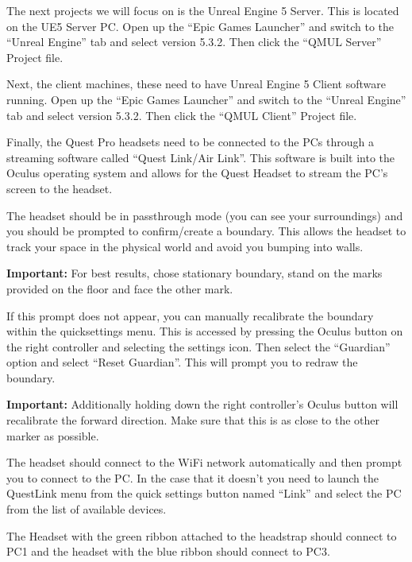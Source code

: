 The next projects we will focus on is the Unreal Engine 5 Server. This is located on the UE5 Server PC. Open up the ``Epic Games Launcher'' and switch to the ``Unreal Engine'' tab and select version 5.3.2. Then click the ``QMUL Server'' Project file.

Next, the client machines, these need to have Unreal Engine 5 Client software running. Open up the ``Epic Games Launcher'' and switch to the ``Unreal Engine'' tab and select version 5.3.2. Then click the ``QMUL Client'' Project file.

Finally, the Quest Pro headsets need to be connected to the PCs through a streaming software called ``Quest Link/Air Link''. This software is built into the Oculus operating system and allows for the Quest Headset to stream the PC's screen to the headset. 

The headset should be in passthrough mode (you can see your surroundings) and you should be prompted to confirm/create a boundary. This allows the headset to track your space in the physical world and avoid you bumping into walls. 

\begin{tcolorbox}
    \textbf{Important:} For best results, chose stationary boundary, stand on the marks provided on the floor and face the other mark.
\end{tcolorbox}

If this prompt does not appear, you can manually recalibrate the boundary within the quicksettings menu. This is accessed by pressing the Oculus button on the right controller and selecting the settings icon. Then select the ``Guardian'' option and select ``Reset Guardian''. This will prompt you to redraw the boundary.

\begin{tcolorbox}
    \textbf{Important:} Additionally holding down the right controller's Oculus button will recalibrate the forward direction. Make sure that this is as close to the other marker as possible.
\end{tcolorbox}

The headset should connect to the WiFi network automatically and then prompt you to connect to the PC. In the case that it doesn't you need to launch the QuestLink menu from the quick settings button named ``Link'' and select the PC from the list of available devices.

The Headset with the green ribbon attached to the headstrap should connect to PC1 and the headset with the blue ribbon should connect to PC3.

